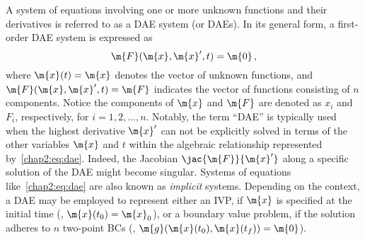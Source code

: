 A system of equations involving one or more unknown functions and their derivatives is referred to as a \ac{DAE} system (or \acp{DAE}). In its general form, a first-order \ac{DAE} system is expressed as
%
\begin{equation}
  \m{F}(\m{x}, \m{x}^{\prime}, t) = \m{0} \, \text{,}
  \label{chap2:eq:dae}
\end{equation}
%
where $\m{x}(t) = \m{x}$ denotes the vector of unknown functions, and $\m{F}(\m{x}, \m{x}^{\prime}, t) = \m{F}$ indicates the vector of functions consisting of $n$ components. Notice the components of $\m{x}$ and $\m{F}$ are denoted as $x_i$ and $F_i$, respectively, for $i = 1, 2, \dots, n$. Notably, the term ``\ac{DAE}'' is typically used when the highest derivative $\m{x}^{\prime}$ can not be explicitly solved in terms of the other variables $\m{x}$ and $t$ within the algebraic relationship represented by~\eqref{chap2:eq:dae}. Indeed, the Jacobian $\jac{\m{F}}{\m{x}^{\prime}}$ along a specific solution of the \ac{DAE} might become singular. Systems of equations like~\eqref{chap2:eq:dae} are also known as \emph{implicit} systems. Depending on the context, a \ac{DAE} may be employed to represent either an \ac{IVP}, if $\m{x}$ is specified at the initial time (\eg{}, $\m{x}(t_0) = \m{x}_0$), or a boundary value problem, if the solution adheres to $n$ two-point \acp{BC} (\eg{}, $\m{g}(\m{x}(t_0), \m{x}(t_f)) = \m{0}$).

